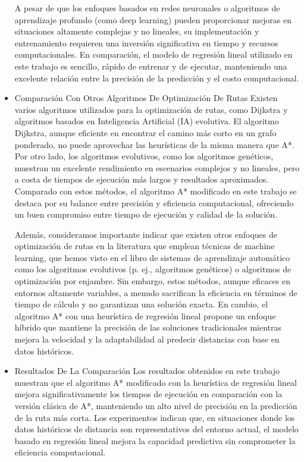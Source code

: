 \documentclass[conference]{IEEEtran}
\begin{document}
\begin{itemize}
	A pesar de que los enfoques basados en redes neuronales o algoritmos de aprendizaje profundo (como deep learning) pueden proporcionar mejoras en situaciones altamente complejas y no lineales, su implementación y entrenamiento requieren una inversión significativa en tiempo y recursos computacionales. En comparación, el modelo de regresión lineal utilizado en este trabajo es sencillo, rápido de entrenar y de ejecutar, manteniendo una excelente relación entre la precisión de la predicción y el costo computacional.
	
	\item Comparación Con Otros Algoritmos De Optimización De Rutas
	Existen varios algoritmos utilizados para la optimización de rutas, como Dijkstra y algoritmos basados en Inteligencia Artificial (IA) evolutiva. El algoritmo Dijkstra, aunque eficiente en encontrar el camino más corto en un grafo ponderado, no puede aprovechar las heurísticas de la misma manera que A*. Por otro lado, los algoritmos evolutivos, como los algoritmos genéticos, muestran un excelente rendimiento en escenarios complejos y no lineales, pero a costa de tiempos de ejecución más largos y resultados aproximados. Comparado con estos métodos, el algoritmo A* modificado en este trabajo se destaca por su balance entre precisión y eficiencia computacional, ofreciendo un buen compromiso entre tiempo de ejecución y calidad de la solución.
	
	Además, consideramos importante indicar que existen otros enfoques de optimización de rutas en la literatura que emplean técnicas de machine learning, que hemos visto en el libro de sistemas de aprendizaje automático como los algoritmos evolutivos (p. ej., algoritmos genéticos) o algoritmos de optimización por enjambre. Sin embargo, estos métodos, aunque eficaces en entornos altamente variables, a menudo sacrifican la eficiencia en términos de tiempo de cálculo y no garantizan una solución exacta. En cambio, el algoritmo A* con una heurística de regresión lineal propone un enfoque híbrido que mantiene la precisión de las soluciones tradicionales mientras mejora la velocidad y la adaptabilidad al predecir distancias con base en datos históricos.
	
	\item Resultados De La Comparación
	Los resultados obtenidos en este trabajo muestran que el algoritmo A* modificado con la heurística de regresión lineal mejora significativamente los tiempos de ejecución en comparación con la versión clásica de A*, manteniendo un alto nivel de precisión en la predicción de la ruta más corta. Los experimentos indican que, en situaciones donde los datos históricos de distancia son representativos del entorno actual, el modelo basado en regresión lineal mejora la capacidad predictiva sin comprometer la eficiencia computacional.
	

\end{itemize}
\end{document}
